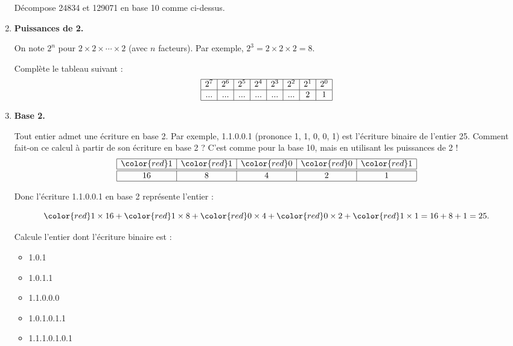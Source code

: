 \documentclass[class=report,crop=false, 12pt]{standalone}
\begin{document}
\begin{activite}
\begin{enumerate}
    Décompose 24834 et  129071 en base 10 comme ci-dessus.
  
  \item \textbf{Puissances de 2.}


    On note $2^n$ pour $2 \times 2 \times \cdots \times 2$ (avec $n$ facteurs). Par exemple, $2^3 = 2 \times 2 \times 2 = 8$. 

    Complète le tableau suivant :
$$
\begin{array}{|c|c|c|c|c|c|c|c|}
  \hline
  2^7  & 2^6 & 2^5 & 2^4 & 2^3 & 2^2 & 2^1 & 2^0 \\
  \hline
  ... & ... & ... & ... & ... & ... & 2 & 1 \\ 
  \hline
\end{array}
$$
    
  \item \textbf{Base 2.}
  
    Tout entier admet une écriture en base 2. Par exemple, 1.1.0.0.1 (prononce 1, 1, 0, 0, 1) est l'écriture binaire de l'entier 25. Comment fait-on ce calcul à partir de son écriture en base 2 ? C'est comme pour la base 10, mais en utilisant les puissances de 2 ! 
$$
\begin{array}{|c|c|c|c|c|}
  \hline
  {\color{red}1} & {\color{red}1} & {\color{red}0} & {\color{red}0} & {\color{red}1} \\ 
  \hline\hline
  16  & 8 & 4 & 2 & 1 \\
  \hline
\end{array}
$$


    Donc l'écriture {\color{red}1}.{\color{red}1}.{\color{red}0}.{\color{red}0}.{\color{red}1} en base 2 représente l'entier : 

    $${\color{red}1} \times 16 + {\color{red}1} \times 8 + {\color{red}0} \times 4 + {\color{red}0} \times 2 + {\color{red}1} \times 1 = 16 + 8 + 1 = 25.$$

    Calcule l'entier dont l'écriture binaire est :
 \begin{itemize}
  \item 1.0.1
  \item 1.0.1.1 
  \item 1.1.0.0.0 
  \item 1.0.1.0.1.1
  \item 1.1.1.0.1.0.1 
\end{itemize}   
 
\end{enumerate}

\end{activite}
\end{document}
